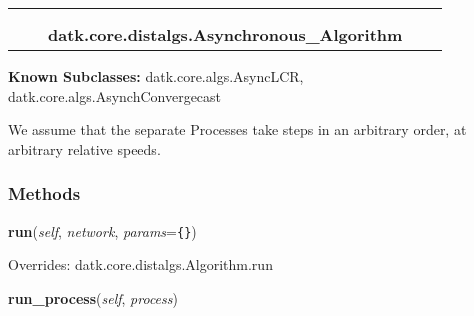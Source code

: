     \label{datk:core:distalgs:Asynchronous_Algorithm}
\begin{tabular}{cccccc}
\multicolumn{2}{r}{\settowidth{\BCL}{datk.core.distalgs.Algorithm}\multirow{2}{\BCL}{datk.core.distalgs.Algorithm}}
&&
  \\\cline{3-3}
  &&\multicolumn{1}{c|}{}
&&
  \\
&&\multicolumn{2}{l}{\textbf{datk.core.distalgs.Asynchronous\_Algorithm}}
\end{tabular}

\textbf{Known Subclasses:}
datk.core.algs.AsyncLCR,
    datk.core.algs.AsynchConvergecast

We assume that the separate Processes take steps in an arbitrary order, at 
arbitrary relative speeds.



  \subsubsection{Methods}

    \vspace{0.5ex}

\hspace{.8\funcindent}\begin{boxedminipage}{\funcwidth}

    \raggedright \textbf{run}(\textit{self}, \textit{network}, \textit{params}={\tt \texttt{\{}\texttt{\}}})

\setlength{\parskip}{2ex}
\setlength{\parskip}{1ex}
      Overrides: datk.core.distalgs.Algorithm.run

    \end{boxedminipage}

    \label{datk:core:distalgs:Asynchronous_Algorithm:run_process}

    \vspace{0.5ex}

\hspace{.8\funcindent}\begin{boxedminipage}{\funcwidth}

    \raggedright \textbf{run\_process}(\textit{self}, \textit{process})

\setlength{\parskip}{2ex}
\setlength{\parskip}{1ex}
    \end{boxedminipage}


